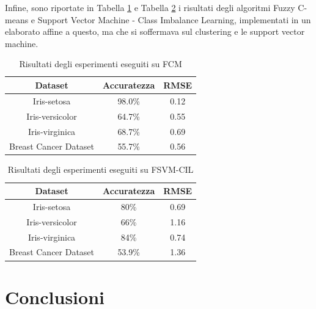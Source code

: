 \documentclass[11pt,  oneside, openany]{book}
\begin{document}
Infine, sono riportate in Tabella \ref{tab:fcm} e Tabella \ref{tab:fsvm} i risultati degli algoritmi Fuzzy C-means e Support Vector Machine - Class Imbalance Learning, implementati in un elaborato affine a questo, ma che si soffermava sul clustering e le support vector machine. 

\begin{table}

    \begin{center}\begin{tabular}{ |c|c|c| } 
        \hline
        \textbf{Dataset} & \textbf{Accuratezza} & \textbf{RMSE}\\
        \hline
        Iris-setosa & 98.0\% & 0.12\\
        \hline
        Iris-versicolor & 64.7\% & 0.55\\
        \hline
        Iris-virginica & 68.7\% & 0.69\\
        \hline
        Breast Cancer Dataset &  55.7\% & 0.56\\
        \hline                  
      \end{tabular}
    \end{center}
    \caption{Risultati degli esperimenti eseguiti su FCM}
    \label{tab:fcm}  
    \end{table}

\begin{table}
      \begin{center}\begin{tabular}{ |c|c|c| } 
        \hline
        Dataset & Accuratezza & RMSE\\
        \hline
        Iris-setosa & 80\% & 0.69\\
        \hline
        Iris-versicolor & 66\% & 1.16\\
        \hline
        Iris-virginica & 84\% & 0.74\\
        \hline
        Breast Cancer Dataset &  53.9\% & 1.36\\
        \hline                  
      \end{tabular}
    \end{center}
      \caption{Risultati degli esperimenti eseguiti su FSVM-CIL}
    \label{tab:fsvm}  
    \end{table}


	\chapter*{Conclusioni}




\end{document}
